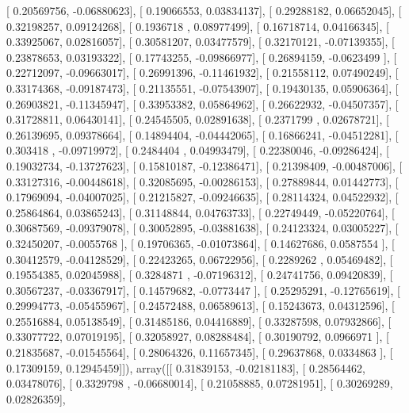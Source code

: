 \documentclass{article}
\begin{document}
       [ 0.20569756, -0.06880623],
       [ 0.19066553,  0.03834137],
       [ 0.29288182,  0.06652045],
       [ 0.32198257,  0.09124268],
       [ 0.1936718 ,  0.08977499],
       [ 0.16718714,  0.04166345],
       [ 0.33925067,  0.02816057],
       [ 0.30581207,  0.03477579],
       [ 0.32170121, -0.07139355],
       [ 0.23878653,  0.03193322],
       [ 0.17743255, -0.09866977],
       [ 0.26894159, -0.0623499 ],
       [ 0.22712097, -0.09663017],
       [ 0.26991396, -0.11461932],
       [ 0.21558112,  0.07490249],
       [ 0.33174368, -0.09187473],
       [ 0.21135551, -0.07543907],
       [ 0.19430135,  0.05906364],
       [ 0.26903821, -0.11345947],
       [ 0.33953382,  0.05864962],
       [ 0.26622932, -0.04507357],
       [ 0.31728811,  0.06430141],
       [ 0.24545505,  0.02891638],
       [ 0.2371799 ,  0.02678721],
       [ 0.26139695,  0.09378664],
       [ 0.14894404, -0.04442065],
       [ 0.16866241, -0.04512281],
       [ 0.303418  , -0.09719972],
       [ 0.2484404 ,  0.04993479],
       [ 0.22380046, -0.09286424],
       [ 0.19032734, -0.13727623],
       [ 0.15810187, -0.12386471],
       [ 0.21398409, -0.00487006],
       [ 0.33127316, -0.00448618],
       [ 0.32085695, -0.00286153],
       [ 0.27889844,  0.01442773],
       [ 0.17969094, -0.04007025],
       [ 0.21215827, -0.09246635],
       [ 0.28114324,  0.04522932],
       [ 0.25864864,  0.03865243],
       [ 0.31148844,  0.04763733],
       [ 0.22749449, -0.05220764],
       [ 0.30687569, -0.09379078],
       [ 0.30052895, -0.03881638],
       [ 0.24123324,  0.03005227],
       [ 0.32450207, -0.0055768 ],
       [ 0.19706365, -0.01073864],
       [ 0.14627686,  0.0587554 ],
       [ 0.30412579, -0.04128529],
       [ 0.22423265,  0.06722956],
       [ 0.2289262 ,  0.05469482],
       [ 0.19554385,  0.02045988],
       [ 0.3284871 , -0.07196312],
       [ 0.24741756,  0.09420839],
       [ 0.30567237, -0.03367917],
       [ 0.14579682, -0.0773447 ],
       [ 0.25295291, -0.12765619],
       [ 0.29994773, -0.05455967],
       [ 0.24572488,  0.06589613],
       [ 0.15243673,  0.04312596],
       [ 0.25516884,  0.05138549],
       [ 0.31485186,  0.04416889],
       [ 0.33287598,  0.07932866],
       [ 0.33077722,  0.07019195],
       [ 0.32058927,  0.08288484],
       [ 0.30190792,  0.0966971 ],
       [ 0.21835687, -0.01545564],
       [ 0.28064326,  0.11657345],
       [ 0.29637868,  0.0334863 ],
       [ 0.17309159,  0.12945459]]), array([[ 0.31839153, -0.02181183],
       [ 0.28564462,  0.03478076],
       [ 0.3329798 , -0.06680014],
       [ 0.21058885,  0.07281951],
       [ 0.30269289,  0.02826359],
\end{document}
